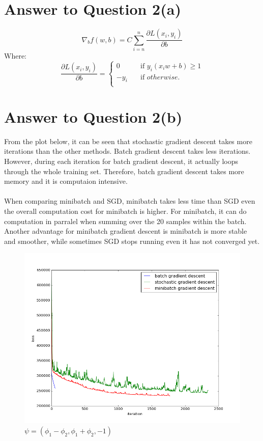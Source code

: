 \documentclass[11pt]{article}
\begin{document}
\pagebreak[4]
\section*{Answer to Question 2(a)}
$$
\nabla_b f(w, b) = C\sum_{i=n}^{n}\frac{\partial L(x_i, y_i)}{\partial b}
$$
Where:
$$
\frac{\partial L(x_i, y_i)}{\partial b} =
  \begin{cases}
    0       & \quad \text{if } y_i(x_i w + b) \geq 1\\
    -y_i  & \quad \text{if } otherwise.\\
  \end{cases}
$$

\pagebreak[4]
\section*{Answer to Question 2(b)}
From the plot below, it can be seen that stochastic gradient descent takes more iterations than the other methods.
Batch gradient descent takes less iterations. However, during each iteration for batch gradient descent, 
it actually loops through the whole training set. Therefore, batch gradient descent takes more memory and it is computaion intensive.\\
\\
When comparing minibatch and SGD, minibatch takes less time than SGD even the overall computation cost for minibatch is higher.
For minibatch, it can do computation in parralel when summing over the 20 samples within the batch.
Another advantage for minibatch gradient descent is minibatch is more stable and smoother, while sometimes SGD stops running even it has not converged yet.

\begin{figure}[h]
\center
\includegraphics[scale=0.5]{gradientDescent.png}
\caption{$\psi=(\phi_1 - \phi_2,\phi_1 + \phi_2,−1)$}
\end{figure}
\end{document}
